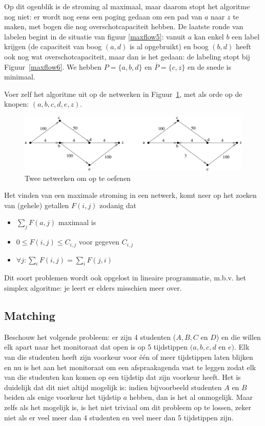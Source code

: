 Op dit ogenblik is de stroming al maximaal, maar daarom stopt het
algoritme nog niet: er wordt nog eens een poging gedaan om een pad van
$a$ naar $z$ te maken, met bogen die nog overschotcapaciteit hebben. De
laatste ronde van labelen begint in de situatie van figuur
\ref{maxflow5}: vanuit $a$ kan enkel $b$ een label krijgen (de capaciteit
van boog $(a,d)$ is al opgebruikt) en boog $(b,d)$ heeft ook nog wat
overschotcapaciteit, maar dan is het gedaan: de labeling stopt bij
Figuur~\ref{maxflow6}. We hebben $P = \{a,b,d\}$ en $\overline{P} =
\{c,z\}$ en de snede is minimaal.

Voer zelf het algoritme uit op de netwerken in Figuur~\ref{maxflow7}, met
als orde op de knopen: $(a,b,c,d,e,z)$.

\begin{figure}[ht]
\begin{center}
\includegraphics[width=0.6\linewidth,keepaspectratio]{maxflow7} %
\end{center}
\caption{Twee netwerken om op te oefenen \label{maxflow7}}
\end{figure}

Het vinden van een maximale stroming in een netwerk, komt neer op het
zoeken van (gehele) getallen $F(i,j)$ zodanig dat
\begin{itemize}
\item
$\sum_{j} F(a,j)$ maximaal is
\item
$0 \leq F(i,j) \leq C_{i,j}$ voor gegeven $C_{i,j}$
\item
$\forall j: \sum_{i} F(i,j) = \sum_{i} F(j,i)$
\end{itemize}

Dit soort problemen wordt ook opgelost in lineaire programmatie,
m.b.v. het simplex algoritme: je leert er elders misschien meer over.

\subsection{Matching}

Beschouw het volgende probleem: er zijn 4 studenten ($A,B,C$ en $D$) en
die willen elk apart naar het monitoraat dat open is op 5 tijdstippen
$(a,b,c,d$ en $e)$. Elk van die studenten heeft zijn voorkeur voor
\'{e}\'{e}n of meer tijdstippen laten blijken en nu is het aan het
monitoraat om een afspraakagenda vast te leggen zodat elk van die
studenten kan komen op een tijdstip dat zijn voorkeur heeft. Het is
duidelijk dat dit niet altijd mogelijk is: indien bijvoorbeeld
studenten $A$ en $B$ beiden als enige voorkeur het tijdstip $a$ hebben, dan
is het al onmogelijk. Maar zelfs als het mogelijk is, is het niet
triviaal om dit probleem op te lossen, zeker niet als er veel meer dan
4 studenten en veel meer dan 5 tijdstippen zijn.

